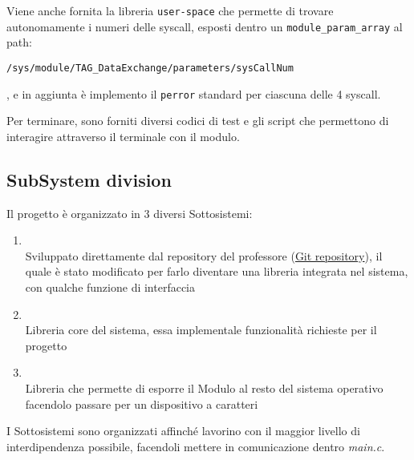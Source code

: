 Viene anche fornita la libreria \texttt{user-space} che permette di trovare autonomamente i numeri delle syscall,
esposti dentro un \verb|module_param_array| al path:
\begin{footnotesize}\verb|/sys/module/TAG_DataExchange/parameters/sysCallNum|\end{footnotesize}, e in aggiunta è
implemento il
\texttt{perror} standard per ciascuna delle 4 syscall.

Per terminare, sono forniti diversi codici di test e gli script che permettono di interagire attraverso il terminale
con il modulo.

\subsection{SubSystem division}

Il progetto è organizzato in 3 diversi Sottosistemi:
\begin{enumerate}
    \item {} \\
    Sviluppato direttamente dal repository del professore
    (\href{https://github.com/FrancescoQuaglia/Linux-sys_call_table-discoverer}{Git repository}), il quale è stato
    modificato per farlo diventare una libreria integrata nel sistema, con qualche funzione di interfaccia
    \item {} \\
    Libreria core del sistema, essa implementale funzionalità richieste per il progetto
    \item {} \\
    Libreria che permette di esporre il Modulo al resto del sistema operativo facendolo passare per un dispositivo a
    caratteri
\end{enumerate}

I Sottosistemi sono organizzati affinché lavorino con il maggior livello di interdipendenza possibile, facendoli
mettere in
comunicazione dentro \textit{main.c}.
